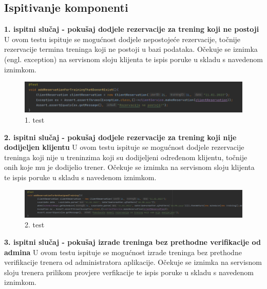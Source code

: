 			\subsection{Ispitivanje komponenti}
             \noindent \textbf{ 1. ispitni slučaj - pokušaj dodjele rezervacije za trening koji ne postoji}
            \newline U ovom testu ispituje se mogućnost dodjele nepostojeće rezervacije, točnije rezervacije termina treninga koji ne postoji u bazi podataka. Očekuje se iznimka (engl. exception) na servisnom sloju klijenta te ispis poruke u skladu s navedenom iznimkom.
            \begin{figure}[H]
		\includegraphics[scale=0.575]{./Slike/test1.png}
		\centering
		\caption{1. test}
		\label{fig:promjene}
	    \end{figure}
            \noindent \textbf{ 2. ispitni slučaj - pokušaj dodjele rezervacije za trening koji nije dodijeljen klijentu}
            \newline U ovom testu ispituje se mogućnost dodjele rezervacije treninga koji nije u treninzima koji su dodijeljeni određenom klijentu, točnije onih koje mu je dodijelio trener. Očekuje se iznimka na servisnom sloju klijenta te ispis poruke u skladu s navedenom iznimkom.
            
            \begin{figure}[H]
		\includegraphics[scale=0.4]{./Slike/test2.png}
		\centering
		\caption{2. test }
		\label{fig:promjene}
	    \end{figure}
            \noindent \textbf{ 3. ispitni slučaj - pokušaj izrade treninga bez prethodne verifikacije od admina}
            \newline U ovom testu ispituje se mogućnost izrade treninga bez prethodne verifikacije trenera od administratora aplikacije. Očekuje se iznimka na servisnom sloju trenera prilikom provjere verfikacije te ispis poruke u skladu s navedenom iznimkom.
            
